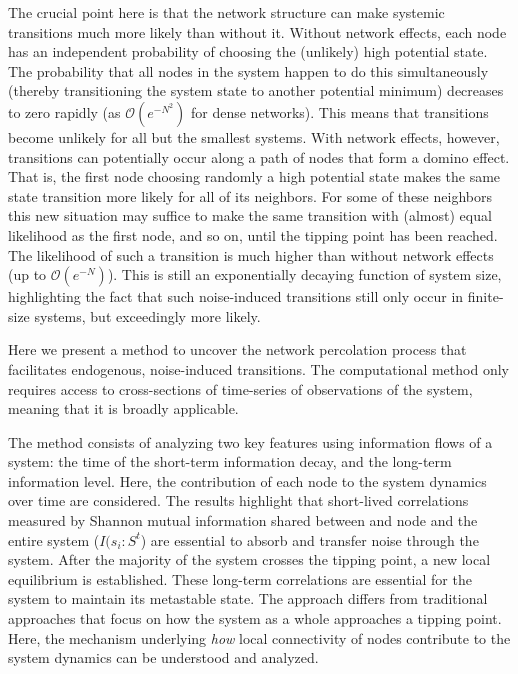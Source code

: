 \documentclass[a4paper, 11pt, twocolumn]{article}
\begin{document}
The crucial point here is that the network structure can make systemic transitions much more likely than without it. Without network effects, each node has an independent probability of choosing the (unlikely) high potential state. The probability that all nodes in the system happen to do this simultaneously (thereby transitioning the system state to another potential minimum) decreases to zero rapidly (as $\mathcal{O}(e^{-N^2})$ for dense networks). This means that transitions become unlikely for all but the smallest systems. With network effects, however, transitions can potentially occur along a path of nodes that form a domino effect. That is, the first node choosing randomly a high potential state makes the same state transition more likely for all of its neighbors. For some of these neighbors this new situation may suffice to make the same transition with (almost) equal likelihood as the first node, and so on, until the tipping point has been reached. The likelihood of such a transition is much higher than without network effects (up to $\mathcal{O}(e^{-N})$). This is still an exponentially decaying function of system size, highlighting the fact that such noise-induced transitions still only occur in finite-size systems, but exceedingly more likely.


Here we present a  method   to    uncover the network percolation process that facilitates  endogenous,   noise-induced
transitions. The computational method only requires access to cross-sections of time-series of observations of the  system, meaning
that it is broadly applicable.

The method consists of analyzing two key features using information flows of a system: the time of the short-term information decay, and the long-term information level. Here, the contribution of each node to the system dynamics over time are considered. The results highlight that short-lived correlations measured by Shannon mutual information shared between and node and the entire system ($I(s_i : S^t$) are essential to absorb and transfer noise through the system. After the majority of the system crosses the tipping point, a new local equilibrium is established. These long-term correlations are essential for the system to maintain its metastable state.
The approach differs from traditional approaches that focus on how the system as a whole approaches a tipping point. Here, the mechanism underlying \emph{how} local connectivity of nodes contribute to the system dynamics can be understood and analyzed.
\end{document}
